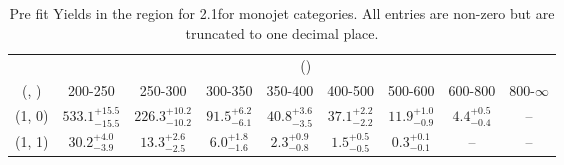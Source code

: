 \begin{table}[h!]
\tiny
\centering
\caption{Pre fit Yields in the \mmj region for 2.1\ifb for monojet categories. All entries are non-zero but are truncated to one decimal place.\label{tab:prednodatanaive_mumu_comb_mono}}
\begin{tabular}
{ccccccccc}
	\hline\hline
	& \multicolumn{8}{c}{\scalht (\gev)} \\ 
	 (\njet,  \nb) & 200-250 & 250-300 & 300-350 & 350-400 & 400-500 & 500-600 & 600-800 & 800-$\infty$ \\ [0.8ex] 
\hline
	(1, 0) & $533.1^{+ 15.5 }_{- 15.5 }$ & $226.3^{+ 10.2 }_{- 10.2 }$ & $91.5^{+ 6.2 }_{- 6.1 }$ & $40.8^{+ 3.6 }_{- 3.5 }$ & $37.1^{+ 2.2 }_{- 2.2 }$ & $11.9^{+ 1.0 }_{- 0.9 }$ & $4.4^{+ 0.5 }_{- 0.4 }$ & -- \\[0.5ex] 
	(1, 1) & $30.2^{+ 4.0 }_{- 3.9 }$ & $13.3^{+ 2.6 }_{- 2.5 }$ & $6.0^{+ 1.8 }_{- 1.6 }$ & $2.3^{+ 0.9 }_{- 0.8 }$ & $1.5^{+ 0.5 }_{- 0.5 }$ & $0.3^{+ 0.1 }_{- 0.1 }$ & -- & -- \\[0.5ex] 
	\hline
	\hline
\end{tabular}
\end{table}
